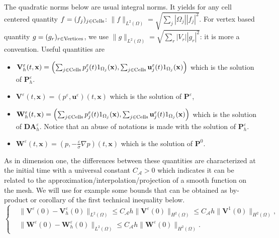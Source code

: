 \documentclass[a4paper,french,english,10pt]{article}
\newcommand\uu{\mathbf{u}}
\newcommand\eps{\varepsilon}
\newcommand\x{\mathbf{x}}
\begin{document}
The quadratic norms below are usual integral norms.
It yields for   any cell centered quantity $f=(f_j)_{j\in {\rm Cells}}$: 
$\|f\|_{L^2(\Omega)}=\sqrt{\sum_j |\Omega_j| |f_j|^2   }$. For vertex based %
 quantity $g=(g_r)_{r\in {\rm Vertices}}$, we use 
$\|g\|_{L^2(\Omega)}=\sqrt{\sum_r |V_r| |g_r|^2   }$: it is more a convention.
Useful  quantities  are
\begin{itemize}
\item $\mathbf V_h^\eps(t,\x)=\left(  \sum_{j\in {\rm Cells}} p^\eps_j(t) 1_{\Omega_j}(\x) , \sum_{j\in {\rm Cells}} \uu^\eps_j(t)  1_{\Omega_j}(\x) \right) $
which  is the solution of $\mathbf P_h^\eps$.
\item 
$\mathbf V^\eps(t,\x) =\left(p^\eps, \uu^\eps  \right)(t,\x)$ which is the solution of $\mathbf P^\eps$,
\item $\mathbf W_h^\eps(t,\x) =\left(  \sum_{j\in {\rm Cells}}  p^\eps_j(t) 1_{\Omega_j}(\x) ,  \sum_{j\in {\rm Cells}}  \uu^\eps_j(t)  1_{\Omega_j} (\x) \right) $ 
which is the solution of $\mathbf{DA}_h^\eps$.
Notice that an abuse of notations is  made with the solution
of $\mathbf P_h^\eps$.
\item $\mathbf W^\eps (t,\x) = \left( p ,-\frac\eps\sigma \nabla p  \right) (t,\x)$ which is the solution of $\mathbf P^0$.
\end{itemize}
As in  dimension  one, the  differences between these quantities are characterized at the initial time with a universal
constant $C_\mathcal A>0$ which indicates it can be  related to the approximation/interpolation/projection of a smooth function
on the mesh. We will use for example 
some  bounds that can be obtained as by-product  or corollary of the first technical inequality  below.
\begin{equation}\label{constant_init}
\left\{
\begin{aligned}
&\| \mathbf{V}^\eps(0) - \mathbf{V}^{\eps}_h(0)\|_{L^2(\Omega)} \leq C_\mathcal A h \|  \mathbf V ^\eps(0) \|_  { H^2(\Omega)  } 
\leq  C_\mathcal A h \|  \mathbf V ^1(0) \|_  { H^2(\Omega)  } ,\\
&\| \mathbf{W}^\eps(0)- \mathbf{W}^{\eps}_h(0)\|_{L^2(\Omega)} \leq C_\mathcal A h \|  \mathbf W ^\eps(0) \|_  { H^2(\Omega)  } .
\end{aligned}
\right.
\end{equation}
\end{document}
